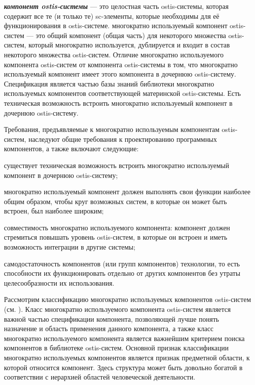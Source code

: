 \textit{\textbf{компонент ostis-системы}} --- это целостная часть ostis-системы, которая содержит все те (и только те) sc-элементы, которые необходимы для её функционирования в ostis-системе. многократно используемый компонент ostis-систем --- это общий компонент (общая часть) для некоторого множества ostis-систем, который многократно используется, дублируется и входит в состав некоторого множества ostis-систем.
Отличие многократно используемого компонента ostis-систем от компонента ostis-системы в том, что многократно используемый компонент имеет  этого компонента в дочернюю ostis-систему. Спецификация является частью базы знаний библиотеки многократно используемых компонентов соответствующей материнской ostis-системы. Есть техническая возможность встроить многократно используемый компонент в дочернюю ostis-систему.

Требования, предъявляемые к многократно используемым компонентам ostis-систем, наследуют общие требования к проектированию программных компонентов, а также включают следующие:
\begin{textitemize}
	\item существует техническая возможность встроить многократно используемый компонент в дочернюю ostis-систему;
	\item многократно используемый компонент должен выполнять свои функции наиболее общим образом, чтобы круг возможных систем, в которые он может быть встроен, был наиболее широким;
	\item совместимость многократно используемого компонента: компонент должен стремиться повышать уровень  ostis-систем, в которые он встроен и иметь возможность  интеграции в другие системы;
	\item самодостаточность компонентов (или групп компонентов) технологии, то есть способности их функционировать отдельно от других компонентов без утраты целесообразности их использования.
\end{textitemize}

Рассмотрим классификацию многократно используемых компонентов ostis-систем (см. ). Класс многократно используемого компонента ostis-систем является важной частью спецификации компонента, позволяющей лучше понять назначение и область применения данного компонента, а также класс многократно используемого компонента является важнейшим критерием поиска компонентов в библиотеке ostis-систем. Основной признак классификации многократно используемых компонентов является признак предметной области, к которой относится компонент. Здесь структура может быть довольно богатой в соответствии с иерархией областей человеческой деятельности.


